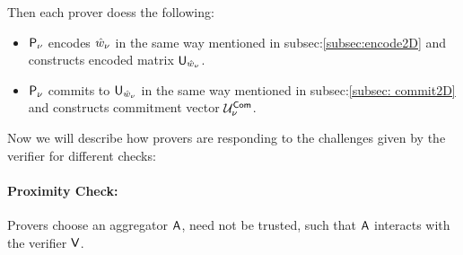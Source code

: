 Then each prover doess the following:
\begin{itemize}
	\item $\mathsf{P}_{\nu}$ encodes $\hat{w}_{\nu}$ in the same way mentioned in subsec:\ref{subsec:encode2D} and constructs encoded matrix $\mathsf{U}_{\hat{w}_{\nu}}$.
	\item $\mathsf{P}_{\nu}$ commits to $\mathsf{U}_{\hat{w}_{\nu}}$ in the same way mentioned in subsec:\ref{subsec: commit2D} and constructs commitment vector $\mathcal{U}^{\mathsf{Com}}_{\nu}$.
\end{itemize}

Now we will describe how provers are responding to the challenges given by the verifier for different checks:
\paragraph{Proximity Check:}
Provers choose an aggregator $\mathsf{A}$, need not be trusted, such that $\mathsf{A}$ interacts with the verifier $\mathsf{V}$. 

